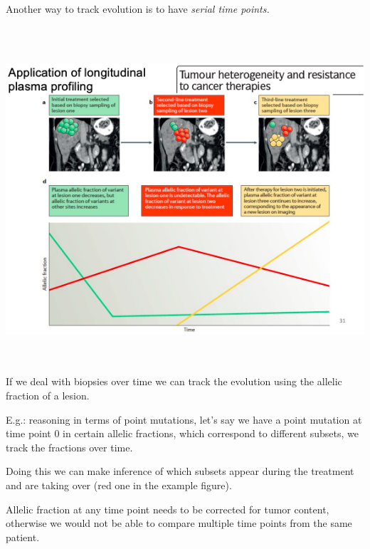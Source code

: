 Another way to track evolution is to have \emph{serial time points.}

\includegraphics[width=6.68889in,height=5.05486in]{image16.png}\\

If we deal with biopsies over time we can track the evolution using the allelic
fraction of a lesion.

E.g.: reasoning in terms of point mutations, let's say we have a point mutation
at time point 0 in certain allelic fractions, which correspond to different
subsets, we track the fractions over time.

Doing this we can make inference of which subsets appear during the treatment
and are taking over (red one in the example figure).

Allelic fraction at any time point needs to be corrected for tumor content,
otherwise we would not be able to compare multiple time points from the same
patient.
